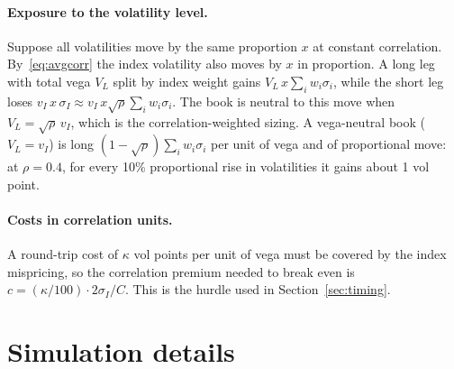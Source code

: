\paragraph{Exposure to the volatility level.} Suppose all volatilities move by the same proportion $x$ at constant correlation. By~\eqref{eq:avgcorr} the index volatility also moves by $x$ in proportion. A long leg with total vega $V_L$ split by index weight gains $V_L\,x\sum_i w_i\sigma_i$, while the short leg loses $v_I\,x\,\sigma_I \approx v_I\,x\sqrt{\rho}\sum_i w_i\sigma_i$. The book is neutral to this move when $V_L = \sqrt{\rho}\,v_I$, which is the correlation-weighted sizing. A vega-neutral book ($V_L = v_I$) is long $(1-\sqrt{\rho})\sum_i w_i\sigma_i$ per unit of vega and of proportional move: at $\rho = 0.4$, for every 10\% proportional rise in volatilities it gains about 1 vol point.

\paragraph{Costs in correlation units.} A round-trip cost of $\kappa$ vol points per unit of vega must be covered by the index mispricing, so the correlation premium needed to break even is $c = (\kappa/100)\cdot 2\sigma_I/C$. This is the hurdle used in Section~\ref{sec:timing}.

\section{Simulation details}\label{app:engine}

